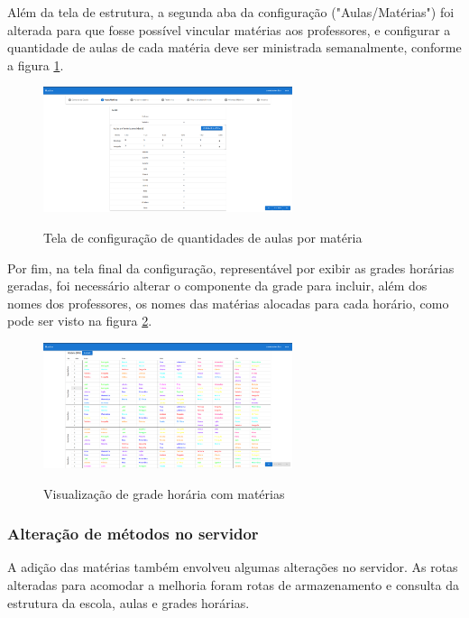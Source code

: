 Além da tela de estrutura, a segunda aba da configuração ("Aulas/Matérias") foi alterada para que fosse possível vincular matérias aos professores, e configurar a quantidade de aulas de cada matéria deve ser ministrada semanalmente, conforme a figura \ref{fig:alteracaoAulas}.

\begin{figure}[!htb]
	\centering
	\caption{Tela de configuração de quantidades de aulas por matéria}
	\includegraphics[width=0.65\textwidth]{./dados/figuras/alteracaoAulas}
	\label{fig:alteracaoAulas}
\end{figure}

Por fim, na tela final da configuração, representável por exibir as grades horárias geradas, foi necessário alterar o componente da grade para incluir, além dos nomes dos professores, os nomes das matérias alocadas para cada horário, como pode ser visto na figura \ref{fig:alteracaoHorario}.

\begin{figure}[!htb]
	\centering
	\caption{Visualização de grade horária com matérias}
	\includegraphics[width=0.65\textwidth]{./dados/figuras/alteracaoHorarios}
	\label{fig:alteracaoHorario}
\end{figure}

\subsubsection{Alteração de métodos no servidor}
A adição das matérias também envolveu algumas alterações no servidor. As rotas alteradas para acomodar a melhoria foram rotas de armazenamento e consulta da estrutura da escola, aulas e grades horárias.

